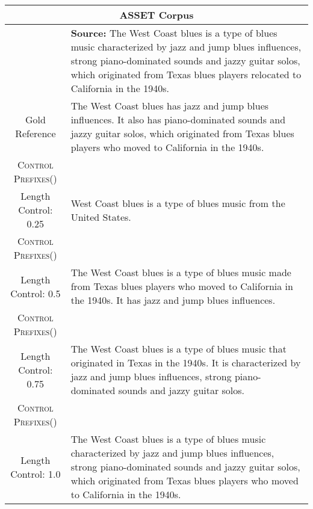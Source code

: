 \documentclass[11pt]{article}
\newcommand{\control}{\textsc{Control Prefixes}\xspace}
\newcommand{\rd}[1]{{\color{red}  #1}}
\begin{document}
\begin{table*}[bth!]
\scriptsize
  \centering
  \renewcommand{\arraystretch}{1.3}
  \begin{tabular}{c|p{}}
  \hline
 
  \multicolumn{2}{c}{\textbf{ASSET Corpus}} \\ \hline
 & \textbf{Source:} The West Coast blues is a type of blues music characterized by jazz and jump blues influences, strong piano-dominated sounds and jazzy guitar solos, which originated from Texas blues players relocated to California in the 1940s. \\ \hline

  
Gold Reference
& The West Coast blues has jazz and jump blues influences. It also has piano-dominated sounds and jazzy guitar solos, which originated from Texas blues players who moved to California in the 1940s. \\ \hline
\control  ()\\Length Control: \rd{0.25}
& West Coast blues is a type of blues music from the United States.\\ \hline
\control  ()\\Length Control: \rd{0.5}
& The West Coast blues is a type of blues music made from Texas blues players who moved to California in the 1940s. It has jazz and jump blues influences.\\ \hline
\control  ()\\Length Control: \rd{0.75}
& The West Coast blues is a type of blues music that originated in Texas in the 1940s. It is characterized by jazz and jump blues influences, strong piano-dominated sounds and jazzy guitar solos.\\ \hline
\control  ()\\Length Control: \rd{1.0}
& The West Coast blues is a type of blues music characterized by jazz and jump blues influences, strong piano-dominated sounds and jazzy guitar solos, which originated from Texas blues players who moved to California in the 1940s. 
\\ \midrule \hline




  \end{tabular}
  \caption{\textbf{Controlled text simplification}: a qualitative example from the ASSET Corpus validation set, with our corresponding \control model outputs. Only the control prefix for the length control ratio is varied, depicted in \rd{red}. Note, this is one random gold reference out of 10.}
  \label{tab:controlled_simp}
\end{table*}
\end{document}
